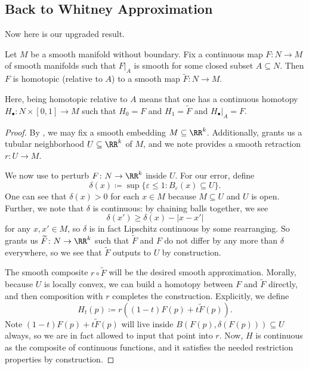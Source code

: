 \documentclass[../notes.tex]{subfiles}
\begin{document}
\subsection{Back to Whitney Approximation}
Now here is our upgraded result.
\begin{theorem} \label{thm:whitney-approx}
	Let $M$ be a smooth manifold without boundary. Fix a continuous map $F\colon N\to M$ of smooth manifolds such that $F|_A$ is smooth for some closed subset $A\subseteq N$. Then $F$ is homotopic (relative to $A$) to a smooth map $\widetilde F\colon N\to M$.
\end{theorem}
Here, being homotopic relative to $A$ means that one has a continuous homotopy $H_\bullet\colon N\times[0,1]\to M$ such that $H_0=F$ and $H_1=\widetilde F$ and $H_\bullet|_A=F$.
\begin{proof}
	By , we may fix a smooth embedding $M\subseteq\RR^k$. Additionally,  grants us a tubular neighborhood $U\subseteq\RR^k$ of $M$, and we note  provides a smooth retraction $r\colon U\to M$.

	We now use  to perturb $F\colon N\to\RR^k$ inside $U$. For our error, define
	\[\delta(x)\coloneqq\sup\{\varepsilon\le1:B_\varepsilon(x)\subseteq U\}.\]
	One can see that $\delta(x)>0$ for each $x\in M$ because $M\subseteq U$ and $U$ is open. Further, we note that $\delta$ is continuous: by chaining balls together, we see
	\[\delta(x')\ge\delta(x)-\left|x-x'\right|\]
	for any $x,x'\in M$, so $\delta$ is in fact Lipschitz continuous by some rearranging. So  grants us $\widetilde F\colon N\to\RR^k$ such that $\widetilde F$ and $F$ do not differ by any more than $\delta$ everywhere, so we see that $\widetilde F$ outputs to $U$ by construction.

	The smooth composite $r\circ\widetilde F$ will be the desired smooth approximation. Morally, because $U$ is locally convex, we can build a homotopy between $F$ and $\widetilde F$ directly, and then composition with $r$ completes the construction. Explicitly, we define
	\[H_t(p)\coloneqq r\left((1-t)F(p)+t\widetilde F(p)\right).\]
	Note $(1-t)F(p)+t\widetilde F(p)$ will live inside $B(F(p),\delta(F(p)))\subseteq U$ always, so we are in fact allowed to input that point into $r$. Now, $H$ is continuous as the composite of continuous functions, and it satisfies the needed restriction properties by construction.
\end{proof}
\end{document}
